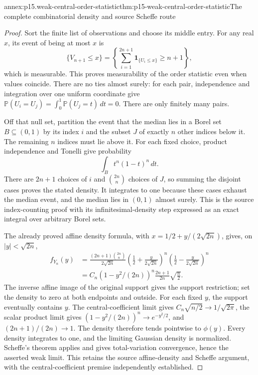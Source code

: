 \begin{annexitem}{annex:p15.weak-central-order-statistic}{thm:p15-weak-central-order-statistic}{The complete combinatorial density and source Scheffe route}
\begin{proof}
Sort the finite list of observations and choose its middle
entry. For any real \(x\), its event of being at most \(x\)
is
\[
 \{V_{n+1}\leq x\}
   =\left\{\sum_{i=1}^{2n+1}\mathbf1_{\{U_i\leq x\}}\geq n+1\right\},
\]
which is measurable. This proves measurability of the order
statistic even when values coincide.
There are no ties almost surely: for each pair, independence
and integration over one uniform coordinate give
\(\mathbb P(U_i=U_j)=\int_0^1\mathbb P(U_j=t)\,dt=0\).
There are only finitely many pairs.

Off that null set, partition the event that the median lies
in a Borel set \(B\subseteq(0,1)\) by its index \(i\) and
the subset \(J\) of exactly \(n\) other indices below it.
The remaining \(n\) indices must lie above it. For each fixed
choice, product independence and Tonelli give probability
\[
 \int_B t^n(1-t)^n\,dt.
\]
There are \(2n+1\) choices of \(i\) and \(\binom{2n}{n}\)
choices of \(J\), so summing the disjoint cases proves the
stated density. It integrates to one because these cases
exhaust the median event, and the median lies in \((0,1)\)
almost surely. This is the source index-counting proof
with its infinitesimal-density step expressed as an exact
integral over arbitrary Borel sets.

The already proved affine density formula, with
\(x=1/2+y/(2\sqrt{2n})\), gives, on \(|y|<\sqrt{2n}\),
\[
 \begin{aligned}
 f_{Y_n}(y)
 &=\frac{(2n+1)\binom{2n}{n}}{2\sqrt{2n}}
   \left(\frac12+\frac{y}{2\sqrt{2n}}\right)^n
   \left(\frac12-\frac{y}{2\sqrt{2n}}\right)^n\\
 &=C_n(1-y^2/(2n))^n
                      \frac{2n+1}{2n}\sqrt{\frac n2}.
 \end{aligned}
\]
The inverse affine image of the original support gives the
support restriction; set the density to zero at both endpoints
and outside. For each fixed \(y\), the support eventually
contains \(y\). The central-coefficient limit gives
\(C_n\sqrt{n/2}\to1/\sqrt{2\pi}\), the scalar product
limit gives \((1-y^2/(2n))^n\to e^{-y^2/2}\), and
\((2n+1)/(2n)\to1\).
The density therefore tends pointwise to \(\phi(y)\).
Every density integrates to one, and the limiting Gaussian
density is normalized. Scheffe's theorem applies and gives
total-variation convergence, hence the asserted weak limit.
This retains the source affine-density and Scheffe argument,
with the central-coefficient premise independently established.
\end{proof}
\end{annexitem}


